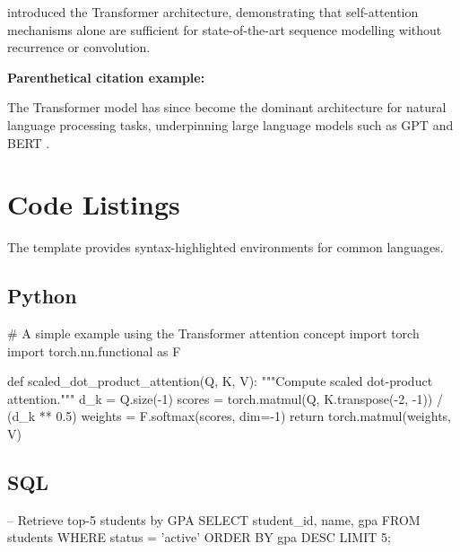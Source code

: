 \citet{vaswani2023attentionneed} introduced the Transformer architecture,
demonstrating that self-attention mechanisms alone are sufficient for
state-of-the-art sequence modelling without recurrence or convolution.

\noindent\textbf{Parenthetical citation example:}

The Transformer model has since become the dominant architecture for natural
language processing tasks, underpinning large language models such as GPT and
BERT \citep{vaswani2023attentionneed}.

\section{Code Listings}

The template provides syntax-highlighted environments for common languages.

\subsection{Python}

\begin{python}
# A simple example using the Transformer attention concept
import torch
import torch.nn.functional as F

def scaled_dot_product_attention(Q, K, V):
    """Compute scaled dot-product attention."""
    d_k = Q.size(-1)
    scores = torch.matmul(Q, K.transpose(-2, -1)) / (d_k ** 0.5)
    weights = F.softmax(scores, dim=-1)
    return torch.matmul(weights, V)
\end{python}

\subsection{SQL}

\begin{sql}
-- Retrieve top-5 students by GPA
SELECT student_id, name, gpa
FROM   students
WHERE  status = 'active'
ORDER  BY gpa DESC
LIMIT  5;
\end{sql}
